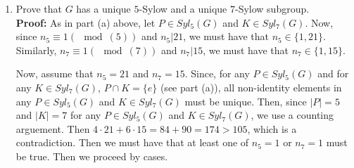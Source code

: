 \documentclass{article}
\begin{document}
\begin{enumerate}
\begin{enumerate}
\begin{align*}
            ab &= p_1k_1p_2k_2 \\
            &= p_1p_3k_3k_2 \\
            &= p_4k_4 \in PK \\
            &\Longrightarrow ab \in PK \\
            &\Longrightarrow PK \leq G.
        \end{align*}
        Now, since $P \in Syl_5(G)$ and $K \in Syl_7(G)$, $|P|=5$ and $|K| = 7$. Further, note that $P \cap K \leq P$ and $P \cap K \leq K$. 
        Then, by La Grange's Theorem, $|P \cap K| \big| |P|$ and $|P \cap K| \big| |K|$. Now, the only common factor of $5$ and $7$ is $1$, 
        so $|P \cap K| = 1$. Thusly, $P \cap K = \{e\}$. Then
        \[
            |PK| = \dfrac{|P||K|}{|P \cap K|} = \dfrac{5 \cdot 7}{1} = 35,
        \]
        so $|PK|=35$. Lastly, we must show that $PK$ is cyclic. Again citing Sylow's Theorems, note that, since $|PK| = 5 \cdot 7$, we know 
        $P \in Syl_5(PK)$ and $K \in Syl_7(PK)$. Further, $n_5 \equiv 1(\mod{(5)})$ and $n_5 \big| 7$, so $n_5 = 1$ and we obtain $P
        \trianglelefteq PK$. Similarly, $n_7 \equiv 1(\mod{(7)})$ and $n_7 \big| 5$, so $n_7 = 1$ and we obtain $K \trianglelefteq PK$. Then,
        by the Normal Factoring Lemma, we have that $PK \cong P \times K$. Further, since $|P|=5$ and $|K| = 7$, we know $P \cong \mathbb{Z}_5$
        and $K \cong \mathbb{Z}_7$. Then $PK \cong \mathbb{Z}_5 \times \mathbb{Z}_7$, so we must have that $PK$ is cyclic. $\square$
        
        \item Prove that $G$ has a unique $5$-Sylow and a unique $7$-Sylow subgroup.\\
        
        \textbf{Proof:} As in part (a) above, let $P \in Syl_5(G)$ and $K \in Syl_7(G)$. Now, since $n_5 \equiv 1(\mod{(5)})$ and $n_5 
        \big| 21$, we must have that $n_5 \in \{1,21\}$. Similarly, $n_7 \equiv 1(\mod{(7)})$ and $n_7 \big| 15$, we must have that $n_7 
        \in \{1,15\}$. 
        
        Now, assume that $n_5 = 21$ and $n_7= 15$. Since, for any $P \in Syl_5(G)$ and for any $K \in Syl_7(G)$, 
        $P \cap K = \{e\}$ (see part (a)), all non-identity elements in any $P \in Syl_5(G)$ and $K \in Syl_7(G)$ must be unique. Then, 
        since $|P| = 5$ and $|K|=7$ for any $P \in Syl_5(G)$ and $K \in Syl_7(G)$, we use a counting arguement. Then $4 \cdot 21+6 \cdot 
        15 = 84+90=174 > 105$, which is a contradiction. Then we must have that at least one of $n_5=1$ or $n_7=1$ must be true. Then we
        proceed by cases.


\end{enumerate}
\end{enumerate}
\end{document}
